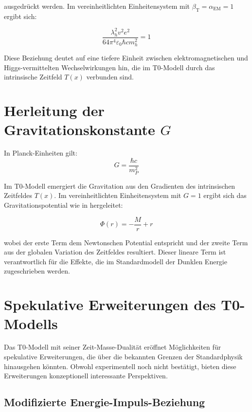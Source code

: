 \documentclass[12pt,a4paper]{article}
\newcommand{\Tfield}{T(x)}
\newcommand{\betaT}{\beta_{\text{T}}}
\newcommand{\alphaEM}{\alpha_{\text{EM}}}
\begin{document}
	ausgedrückt werden. Im vereinheitlichten Einheitensystem mit \(\betaT = \alphaEM = 1\) ergibt sich:
	
	\begin{equation}
		\frac{\lambda_h^2 v^2 e^2}{64\pi^4\varepsilon_0\hbar c m_h^2} = 1
	\end{equation}
	
	Diese Beziehung deutet auf eine tiefere Einheit zwischen elektromagnetischen und Higgs-vermittelten Wechselwirkungen hin, die im T0-Modell durch das intrinsische Zeitfeld \(\Tfield\) verbunden sind.
	
	\section{Herleitung der Gravitationskonstante \(G\)}
	
	In Planck-Einheiten gilt:
	\begin{equation}
		G = \frac{\hbar c}{m_P^2}
	\end{equation}
	
	Im T0-Modell emergiert die Gravitation aus den Gradienten des intrinsischen Zeitfeldes \(\Tfield\). Im vereinheitlichten Einheitensystem mit \(G = 1\) ergibt sich das Gravitationspotential wie in \cite{pascher_emergente_gravitation_2025} hergeleitet:
	
	\begin{equation}
		\Phi(r) = -\frac{M}{r} + r
	\end{equation}
	
	wobei der erste Term dem Newtonschen Potential entspricht und der zweite Term aus der globalen Variation des Zeitfeldes resultiert. Dieser lineare Term ist verantwortlich für die Effekte, die im Standardmodell der Dunklen Energie zugeschrieben werden.
	
	\section{Spekulative Erweiterungen des T0-Modells}
	
	Das T0-Modell mit seiner Zeit-Masse-Dualität eröffnet Möglichkeiten für spekulative Erweiterungen, die über die bekannten Grenzen der Standardphysik hinausgehen könnten. Obwohl experimentell noch nicht bestätigt, bieten diese Erweiterungen konzeptionell interessante Perspektiven.
	
	\subsection{Modifizierte Energie-Impuls-Beziehung}
	
\end{document}
